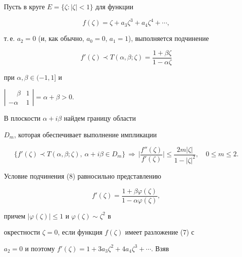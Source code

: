 Пусть в круге $E=\{\zeta:|\zeta|<1\}$ для функции


\begin{equation}


f(\zeta)=\zeta+a_3\zeta^3+a_4\zeta^4+\dotsb,


\end{equation}


т.\,е. $a_2=0$ (и, как обычно, $a_0=0$, $a_1=1$), выполняется подчинение


\begin{equation}


f'(\zeta)\prec T(\alpha,\beta;\zeta)=


\frac{1+\beta\zeta}{1-\alpha\zeta}


\end{equation}


при $\alpha,\beta\in(-1,1]$ и


$\left|


\begin{smallmatrix}\phantom{-}\beta & 1 \\ -\alpha & 1\end{smallmatrix}


\right|=\alpha+\beta>0$.


В плоскости $\alpha+i\beta$ найдем границу области


$D_m$, которая обеспечивает выполнение импликации


\begin{equation}


\{f'(\zeta)\prec T(\alpha,\beta;\zeta),\ \alpha+i\beta\in D_m\}


\,\Longrightarrow\,


\biggl|\frac{f''(\zeta)}{f'(\zeta)}\biggr|\le


\frac{2m|\zeta|}{1-|\zeta|^2},\quad 0\le m\le 2.


\end{equation}


Условие подчинения (8) равносильно представлению


$$


f'(\zeta)=\frac{1+\beta\varphi(\zeta)}{1-\alpha\varphi(\zeta)},


$$


причем $|\varphi(\zeta)|\le 1$ и $\varphi(\zeta)\sim\zeta^2$ в


окрестности $\zeta=0$, если функция $f(\zeta)$ имеет разложение (7) с


$a_2=0$ и поэтому $f'(\zeta)=1+3a_3\zeta^2+4a_4\zeta^3+\dotsb$. Взяв


